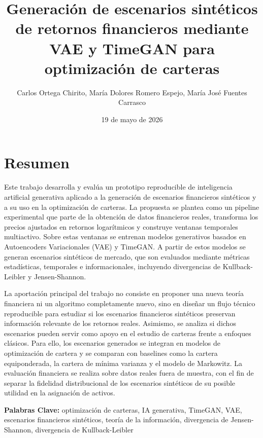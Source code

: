 \documentclass[11pt,a4paper,spanish,oneside]{book}
\title{Generación de escenarios sintéticos de retornos financieros mediante VAE y TimeGAN para optimización de carteras}
\author{Carlos Ortega Chirito, María Dolores Romero Espejo, María José Fuentes Carrasco}
\date{19 de mayo de 2026}
\numberwithin{equation}{chapter}
\numberwithin{figure}{chapter}
\begin{document}
\renewcommand{\listfigurename}{Índice de Ilustraciones}
\renewcommand{\listtablename}{Índice de Tablas}
\renewcommand{\contentsname}{Índice de Contenidos}
\renewcommand{\figurename}{Figura}
\renewcommand{\tablename}{Tabla} 

\hypersetup{pageanchor=false}
\maketitle
\hypersetup{pageanchor=true}

\frontmatter
\tableofcontents
\listoffigures
\listoftables

\chapter{Resumen}
Este trabajo desarrolla y evalúa un prototipo reproducible de inteligencia artificial generativa aplicado a la generación de escenarios financieros sintéticos y a su uso en la optimización de carteras. La propuesta se plantea como un pipeline experimental que parte de la obtención de datos financieros reales, transforma los precios ajustados en retornos logarítmicos y construye ventanas temporales multiactivo. Sobre estas ventanas se entrenan modelos generativos basados en Autoencoders Variacionales (VAE) y TimeGAN. A partir de estos modelos se generan escenarios sintéticos de mercado, que son evaluados mediante métricas estadísticas, temporales e informacionales, incluyendo divergencias de Kullback-Leibler y Jensen-Shannon.

La aportación principal del trabajo no consiste en proponer una nueva teoría financiera ni un algoritmo completamente nuevo, sino en diseñar un flujo técnico reproducible para estudiar si los escenarios financieros sintéticos preservan información relevante de los retornos reales. Asimismo, se analiza si dichos escenarios pueden servir como apoyo en el estudio de carteras frente a enfoques clásicos. Para ello, los escenarios generados se integran en modelos de optimización de cartera y se comparan con baselines como la cartera equiponderada, la cartera de mínima varianza y el modelo de Markowitz. La evaluación financiera se realiza sobre datos reales fuera de muestra, con el fin de separar la fidelidad distribucional de los escenarios sintéticos de su posible utilidad en la asignación de activos.


{\bf Palabras Clave:} optimización de carteras, IA generativa, TimeGAN, VAE, escenarios financieros sintéticos, teoría de la información, divergencia de Jensen-Shannon, divergencia de Kullback-Leibler
\end{document}
